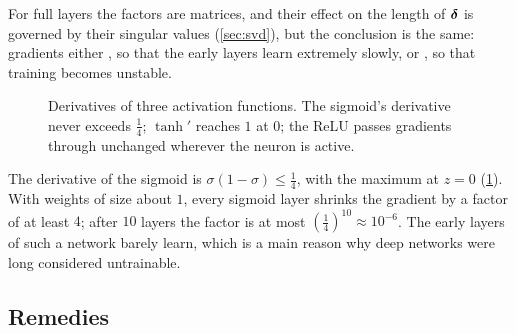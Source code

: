 For full layers the factors are matrices, and their effect on the length of
$\bm{\delta}$ is governed by their singular values (\cref{sec:svd}), but the
conclusion is the same: gradients either ,
so that the early layers learn extremely slowly, or , so that training becomes unstable.

\begin{figure}[htbp]
\centering
{}
\caption{Derivatives of three activation functions. The sigmoid's derivative
  never exceeds $\frac14$; $\tanh'$ reaches $1$ at $0$; the ReLU passes gradients
  through unchanged wherever the neuron is active.}
\label{fig:activation-derivatives}
\end{figure}

\begin{example}\label{ex:sigmoid-vanishing}
The derivative of the sigmoid is $\sigma(1 - \sigma) \le \frac14$, with the maximum at
$z = 0$ (\cref{fig:activation-derivatives}). With weights of size about $1$, every
sigmoid layer shrinks the gradient by a factor of at least $4$; after $10$ layers
the factor is at most $\left(\frac14\right)^{10} \approx 10^{-6}$. The early layers of
such a network barely learn, which is a main reason why deep networks were long
considered untrainable.
\end{example}

\subsection{Remedies}

